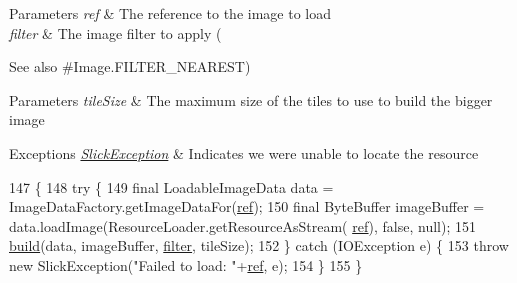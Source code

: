 \begin{DoxyParams}{Parameters}
{\em ref} & The reference to the image to load \\
\hline
{\em filter} & The image filter to apply (\\
\hline
\end{DoxyParams}
\begin{DoxySeeAlso}{See also}
\#\+Image.\+F\+I\+L\+T\+E\+R\+\_\+\+N\+E\+A\+R\+E\+ST) 
\end{DoxySeeAlso}

\begin{DoxyParams}{Parameters}
{\em tile\+Size} & The maximum size of the tiles to use to build the bigger image \\
\hline
\end{DoxyParams}

\begin{DoxyExceptions}{Exceptions}
{\em \mbox{\hyperlink{classorg_1_1newdawn_1_1slick_1_1_slick_exception}{Slick\+Exception}}} & Indicates we were unable to locate the resource \\
\hline
\end{DoxyExceptions}

\begin{DoxyCode}
147                                                                                    \{
148         \textcolor{keywordflow}{try} \{
149             \textcolor{keyword}{final} LoadableImageData data = ImageDataFactory.getImageDataFor(\mbox{\hyperlink{classorg_1_1newdawn_1_1slick_1_1_image_a32694687591a80299d8b8ad1ea070cee}{ref}});
150             \textcolor{keyword}{final} ByteBuffer imageBuffer = data.loadImage(ResourceLoader.getResourceAsStream(
      \mbox{\hyperlink{classorg_1_1newdawn_1_1slick_1_1_image_a32694687591a80299d8b8ad1ea070cee}{ref}}), \textcolor{keyword}{false}, null);
151             \mbox{\hyperlink{classorg_1_1newdawn_1_1slick_1_1_big_image_a22a00890a41ddf7c996a84b2bc32621b}{build}}(data, imageBuffer, \mbox{\hyperlink{classorg_1_1newdawn_1_1slick_1_1_image_a1c6f09687817420f3762f32bb1c3ed76}{filter}}, tileSize);
152         \} \textcolor{keywordflow}{catch} (IOException e) \{
153             \textcolor{keywordflow}{throw} \textcolor{keyword}{new} SlickException(\textcolor{stringliteral}{"Failed to load: "}+\mbox{\hyperlink{classorg_1_1newdawn_1_1slick_1_1_image_a32694687591a80299d8b8ad1ea070cee}{ref}}, e);
154         \}
155     \}
\end{DoxyCode}
\mbox{\label{classorg_1_1newdawn_1_1slick_1_1_big_image_a694a2dff36782f956a8d6cc40081482a}} 
